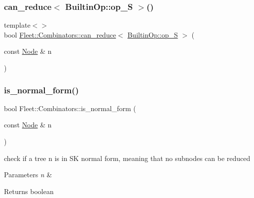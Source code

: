 \mbox{\label{namespace_fleet_1_1_combinators_a12bfc0d27b7b9672fc3a99a74be58523}} 
\subsubsection{\texorpdfstring{can\+\_\+reduce$<$ Builtin\+Op\+::op\+\_\+\+S $>$()}{can\_reduce< BuiltinOp::op\_S >()}}
{\footnotesize\ttfamily template$<$$>$ \\
bool \hyperlink{namespace_fleet_1_1_combinators_a3d456e1f1eeb0569b962e4ddb521c64a}{Fleet\+::\+Combinators\+::can\+\_\+reduce}$<$ \hyperlink{_instruction_8h_af2fb7c87c5854c5733d7bb0506b06de7ae77dc89233eb1fc00d3d1f1a1c1c462e}{Builtin\+Op\+::op\+\_\+S} $>$ (\begin{DoxyParamCaption}\item[{const \hyperlink{class_node}{Node} \&}]{n }\end{DoxyParamCaption})}

\mbox{\label{namespace_fleet_1_1_combinators_ae0176e1feedc8f2db63a7fedd927cdd9}} 
\subsubsection{\texorpdfstring{is\+\_\+normal\+\_\+form()}{is\_normal\_form()}}
{\footnotesize\ttfamily bool Fleet\+::\+Combinators\+::is\+\_\+normal\+\_\+form (\begin{DoxyParamCaption}\item[{const \hyperlink{class_node}{Node} \&}]{n }\end{DoxyParamCaption})}



check if a tree n is in SK normal form, meaning that no subnodes can be reduced 


\begin{DoxyParams}{Parameters}
{\em n} & \\
\hline
\end{DoxyParams}
\begin{DoxyReturn}{Returns}
boolean 
\end{DoxyReturn}
\mbox{\label{namespace_fleet_1_1_combinators_a39ef824add4fb94b4b2d0b967d14641a}} 
